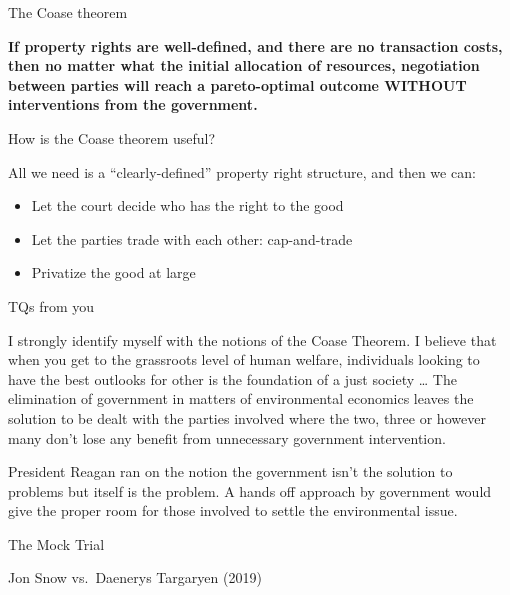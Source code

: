 \begin{frame}{The Coase theorem}
\protect\hypertarget{the-coase-theorem}{}

\textbf{If property rights are well-defined, and there are no
transaction costs, then no matter what the initial allocation of
resources, negotiation between parties will reach a pareto-optimal
outcome WITHOUT interventions from the government.}

\end{frame}

\begin{frame}{How is the Coase theorem useful?}
\protect\hypertarget{how-is-the-coase-theorem-useful}{}

All we need is a ``clearly-defined'' property right structure, and then
we can:

\begin{itemize}
\tightlist
\item
  Let the court decide who has the right to the good
\item
  Let the parties trade with each other: cap-and-trade
\item
  Privatize the good at large
\end{itemize}

\end{frame}

\begin{frame}{TQs from you}
\protect\hypertarget{tqs-from-you}{}

I strongly identify myself with the notions of the Coase Theorem. I
believe that when you get to the grassroots level of human welfare,
individuals looking to have the best outlooks for other is the
foundation of a just society \ldots{} The elimination of government in
matters of environmental economics leaves the solution to be dealt with
the parties involved where the two, three or however many don't lose any
benefit from unnecessary government intervention.

President Reagan ran on the notion the government isn't the solution to
problems but itself is the problem. A hands off approach by government
would give the proper room for those involved to settle the
environmental issue.

\end{frame}

\begin{frame}{The Mock Trial}
\protect\hypertarget{the-mock-trial}{}

Jon Snow vs.~Daenerys Targaryen (2019)

\end{frame}

